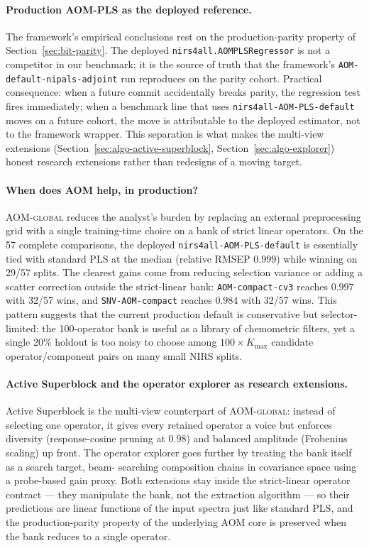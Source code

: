\documentclass[review,a4paper]{elsarticle}
\newcommand{\AOM}{\textsc{AOM}\xspace}
\newcommand{\PLS}{\textsc{PLS}\xspace}
\begin{document}
\paragraph{Production \AOM-\PLS as the deployed reference.}
The framework's empirical conclusions rest on the production-parity
property of Section~\ref{sec:bit-parity}. The deployed
\verb|nirs4all.AOMPLSRegressor| is not a competitor in our benchmark;
it is the source of truth that the framework's
\texttt{AOM-default-nipals-adjoint} run reproduces on the parity
cohort. Practical consequence:
when a future commit accidentally breaks parity, the regression test
fires immediately; when a benchmark line that uses
\verb|nirs4all-AOM-PLS-default| moves on a future cohort, the move is
attributable to the deployed estimator, not to the framework wrapper.
This separation is what makes the multi-view extensions
(Section~\ref{sec:algo-active-superblock},
Section~\ref{sec:algo-explorer}) honest research extensions rather
than redesigns of a moving target.

\paragraph{When does \AOM help, in production?}
\AOM-\textsc{global} reduces the analyst's burden by replacing an
external preprocessing grid with a single training-time choice on a
bank of strict linear operators. On the 57 complete comparisons, the
deployed \verb|nirs4all-AOM-PLS-default| is essentially tied with
standard \PLS at the median (relative RMSEP $0.999$) while winning on
29/57 splits. The clearest gains come from reducing selection variance
or adding a scatter correction outside the strict-linear bank:
\texttt{AOM-compact-cv3} reaches $0.997$ with 32/57 wins, and
\texttt{SNV-AOM-compact} reaches $0.984$ with 32/57 wins. This pattern
suggests that the current production default is conservative but
selector-limited: the 100-operator bank is useful as a library of
chemometric filters, yet a single 20\% holdout is too noisy to choose
among $100\times K_\text{max}$ candidate operator/component pairs on
many small NIRS splits.

\paragraph{Active Superblock and the operator explorer as research
extensions.}
Active Superblock is the multi-view counterpart of \AOM-\textsc{global}:
instead of selecting one operator, it gives every retained operator a
voice but enforces diversity (response-cosine pruning at $0.98$) and
balanced amplitude (Frobenius scaling) up front. The operator explorer
goes further by treating the bank itself as a search target, beam-
searching composition chains in covariance space using a probe-based
gain proxy. Both extensions stay inside the strict-linear operator
contract --- they manipulate the bank, not the extraction algorithm
--- so their predictions are linear functions of the input spectra
just like standard \PLS, and the production-parity property of the
underlying \AOM core is preserved when the bank reduces to a single
operator.
\end{document}
